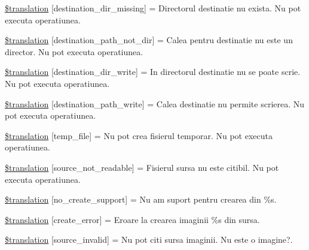 \begin{DoxyCompactItemize}
\item 
\hyperlink{class_8upload_8ro___r_o_8php_a9ef28d3cf09942c6c0a1e77fa09185e8}{\$translation} \mbox{[}\textquotesingle{}destination\+\_\+dir\+\_\+missing\textquotesingle{}\mbox{]} = \textquotesingle{}Directorul destinatie nu exista. Nu pot executa operatiunea.\textquotesingle{}
\item 
\hyperlink{class_8upload_8ro___r_o_8php_a5704a67137126e8c87b7a364175929d4}{\$translation} \mbox{[}\textquotesingle{}destination\+\_\+path\+\_\+not\+\_\+dir\textquotesingle{}\mbox{]} = \textquotesingle{}Calea pentru destinatie nu este un director. Nu pot executa operatiunea.\textquotesingle{}
\item 
\hyperlink{class_8upload_8ro___r_o_8php_a97608ea194a616db49141a0e6dee900c}{\$translation} \mbox{[}\textquotesingle{}destination\+\_\+dir\+\_\+write\textquotesingle{}\mbox{]} = \textquotesingle{}In directorul destinatie nu se poate scrie. Nu pot executa operatiunea.\textquotesingle{}
\item 
\hyperlink{class_8upload_8ro___r_o_8php_a40e4e1962226b89fd76da5819a9602b0}{\$translation} \mbox{[}\textquotesingle{}destination\+\_\+path\+\_\+write\textquotesingle{}\mbox{]} = \textquotesingle{}Calea destinatie nu permite scrierea. Nu pot executa operatiunea.\textquotesingle{}
\item 
\hyperlink{class_8upload_8ro___r_o_8php_a2baece8da11e20d45175db91851ec3e3}{\$translation} \mbox{[}\textquotesingle{}temp\+\_\+file\textquotesingle{}\mbox{]} = \textquotesingle{}Nu pot crea fisierul temporar. Nu pot executa operatiunea.\textquotesingle{}
\item 
\hyperlink{class_8upload_8ro___r_o_8php_a922967ca2df0efdd455261142d8e5715}{\$translation} \mbox{[}\textquotesingle{}source\+\_\+not\+\_\+readable\textquotesingle{}\mbox{]} = \textquotesingle{}Fisierul sursa nu este citibil. Nu pot executa operatiunea.\textquotesingle{}
\item 
\hyperlink{class_8upload_8ro___r_o_8php_a346dfd1ade29f583dd20d345c436859f}{\$translation} \mbox{[}\textquotesingle{}no\+\_\+create\+\_\+support\textquotesingle{}\mbox{]} = \textquotesingle{}Nu am suport pentru crearea din \%s.\textquotesingle{}
\item 
\hyperlink{class_8upload_8ro___r_o_8php_a53013ce9255c4e1849098ddd9fdb2b3f}{\$translation} \mbox{[}\textquotesingle{}create\+\_\+error\textquotesingle{}\mbox{]} = \textquotesingle{}Eroare la crearea imaginii \%s din sursa.\textquotesingle{}
\item 
\hyperlink{class_8upload_8ro___r_o_8php_a6ab0a660b457eaf2d3434b225449fdd6}{\$translation} \mbox{[}\textquotesingle{}source\+\_\+invalid\textquotesingle{}\mbox{]} = \textquotesingle{}Nu pot citi sursa imaginii. Nu este o imagine?.\textquotesingle{}

\end{DoxyCompactItemize}
